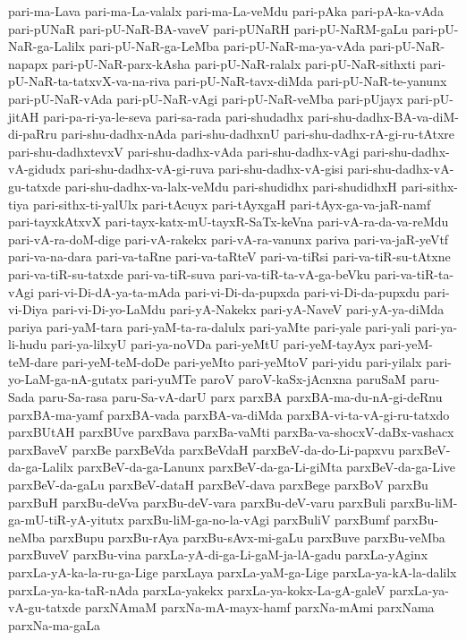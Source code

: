 {pari-ma-Lava
pari-ma-La-valalx
pari-ma-La-veMdu
pari-pAka
pari-pA-ka-vAda
pari-pUNaR
pari-pU-NaR-BA-vaveV
pari-pUNaRH
pari-pU-NaRM-gaLu
pari-pU-NaR-ga-Lalilx
pari-pU-NaR-ga-LeMba
pari-pU-NaR-ma-ya-vAda
pari-pU-NaR-napapx
pari-pU-NaR-parx-kAsha
pari-pU-NaR-ralalx
pari-pU-NaR-sithxti
pari-pU-NaR-ta-tatxvX-va-na-riva
pari-pU-NaR-tavx-diMda
pari-pU-NaR-te-yanunx
pari-pU-NaR-vAda
pari-pU-NaR-vAgi
pari-pU-NaR-veMba
pari-pUjayx
pari-pU-jitAH
pari-pa-ri-ya-le-seva
pari-sa-rada
pari-shudadhx
pari-shu-dadhx-BA-va-diM-di-paRru
pari-shu-dadhx-nAda
pari-shu-dadhxnU
pari-shu-dadhx-rA-gi-ru-tAtxre
pari-shu-dadhxtevxV
pari-shu-dadhx-vAda
pari-shu-dadhx-vAgi
pari-shu-dadhx-vA-gidudx
pari-shu-dadhx-vA-gi-ruva
pari-shu-dadhx-vA-gisi
pari-shu-dadhx-vA-gu-tatxde
pari-shu-dadhx-va-lalx-veMdu
pari-shudidhx
pari-shudidhxH
pari-sithx-tiya
pari-sithx-ti-yalUlx
pari-tAcuyx
pari-tAyxgaH
pari-tAyx-ga-va-jaR-namf
pari-tayxkAtxvX
pari-tayx-katx-mU-tayxR-SaTx-keVna
pari-vA-ra-da-va-reMdu
pari-vA-ra-doM-dige
pari-vA-rakekx
pari-vA-ra-vanunx
pariva
pari-va-jaR-yeVtf
pari-va-na-dara
pari-va-taRne
pari-va-taRteV
pari-va-tiRsi
pari-va-tiR-su-tAtxne
pari-va-tiR-su-tatxde
pari-va-tiR-suva
pari-va-tiR-ta-vA-ga-beVku
pari-va-tiR-ta-vAgi
pari-vi-Di-dA-ya-ta-mAda
pari-vi-Di-da-pupxda
pari-vi-Di-da-pupxdu
pari-vi-Diya
pari-vi-Di-yo-LaMdu
pari-yA-Nakekx
pari-yA-NaveV
pari-yA-ya-diMda
pariya
pari-yaM-tara
pari-yaM-ta-ra-dalulx
pari-yaMte
pari-yale
pari-yali
pari-ya-li-hudu
pari-ya-lilxyU
pari-ya-noVDa
pari-yeMtU
pari-yeM-tayAyx
pari-yeM-teM-dare
pari-yeM-teM-doDe
pari-yeMto
pari-yeMtoV
pari-yidu
pari-yilalx
pari-yo-LaM-ga-nA-gutatx
pari-yuMTe
paroV
paroV-kaSx-jAcnxna
paruSaM
paru-Sada
paru-Sa-rasa
paru-Sa-vA-darU
parx
parxBA
parxBA-ma-du-nA-gi-deRnu
parxBA-ma-yamf
parxBA-vada
parxBA-va-diMda
parxBA-vi-ta-vA-gi-ru-tatxdo
parxBUtAH
parxBUve
parxBava
parxBa-vaMti
parxBa-va-shocxV-daBx-vashacx
parxBaveV
parxBe
parxBeVda
parxBeVdaH
parxBeV-da-do-Li-papxvu
parxBeV-da-ga-Lalilx
parxBeV-da-ga-Lanunx
parxBeV-da-ga-Li-giMta
parxBeV-da-ga-Live
parxBeV-da-gaLu
parxBeV-dataH
parxBeV-dava
parxBege
parxBoV
parxBu
parxBuH
parxBu-deVva
parxBu-deV-vara
parxBu-deV-varu
parxBuli
parxBu-liM-ga-mU-tiR-yA-yitutx
parxBu-liM-ga-no-la-vAgi
parxBuliV
parxBumf
parxBu-neMba
parxBupu
parxBu-rAya
parxBu-sAvx-mi-gaLu
parxBuve
parxBu-veMba
parxBuveV
parxBu-vina
parxLa-yA-di-ga-Li-gaM-ja-lA-gadu
parxLa-yAginx
parxLa-yA-ka-la-ru-ga-Lige
parxLaya
parxLa-yaM-ga-Lige
parxLa-ya-kA-la-dalilx
parxLa-ya-ka-taR-nAda
parxLa-yakekx
parxLa-ya-kokx-La-gA-galeV
parxLa-ya-vA-gu-tatxde
parxNAmaM
parxNa-mA-mayx-hamf
parxNa-mAmi
parxNama
parxNa-ma-gaLa
}
